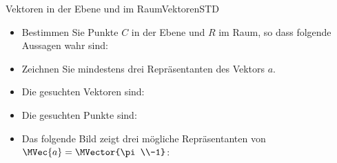 \begin{MXContent}{Vektoren in der Ebene und im Raum}{Vektoren}{STD}
\begin{MExercise}
\begin{itemize}
\item Bestimmen Sie Punkte $C$ in der Ebene und $R$ im Raum, so dass folgende Aussagen wahr sind:\\

\item Zeichnen Sie mindestens drei Repräsentanten des Vektors $a$. 
\end{itemize}


\begin{MHint}{\iSolution}
\begin{itemize}
 \item Die gesuchten Vektoren sind:\\
 \item Die gesuchten Punkte sind:\\
 \item Das folgende Bild zeigt drei mögliche Repräsentanten von $\MVec{a}=\MVector{\pi\\-1}$:
 

\end{itemize}
\end{MHint}
\end{MExercise}
\end{MXContent}
